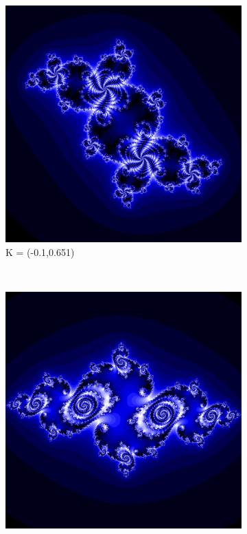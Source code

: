 \documentclass[a4paper]{article}
\begin{document}
\begin{figure}[h]
    \centering
    \begin{subfigure}[h]{0.25\textwidth}
        \includegraphics[width=\textwidth]{Julia(3)}
        \caption{K = (-0.1,0.651)}
        \label{fig:gull}
    \end{subfigure}%
    ~ %
    \begin{subfigure}[h]{0.25\textwidth}
        \includegraphics[width=\textwidth]{Julia(4)}

\end{subfigure}
\end{figure}
\end{document}
